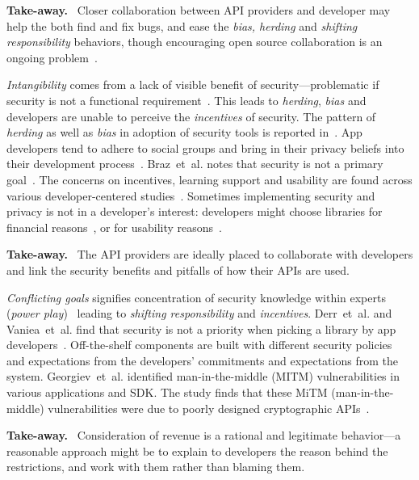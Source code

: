 \documentclass[conference]{IEEEtran}
\newenvironment{finding}{\begin{framed}\noindent\textbf{Take-away.}~}{\end{framed}}
\newcommand{\etal}[0]{et~al{.}}
\begin{document}
\begin{finding}
\noindent  
Closer collaboration between API providers and developer may help the both find and fix bugs, and ease the \emph{bias, herding} and \emph{shifting responsibility} behaviors, though encouraging open source collaboration is an ongoing problem~\cite{german2003gnome}.
\end{finding}

\emph{Intangibility} comes from a lack of visible benefit of security---problematic if security is not a functional requirement~\cite{acar2016}. This leads to \emph{herding}, \emph{bias} and developers are unable to perceive the \emph{incentives} of security. The pattern of \emph{herding} as well as \emph{bias} in adoption of security tools is reported in~\cite{witschey2015}. App developers tend to adhere to social groups and bring in their privacy beliefs into their development process~\cite{senarath2018,senarathundp2018}.  Braz~et~al{.} notes that security is not a primary goal~\cite{braz2021}. The concerns on incentives, learning support and usability are found across various developer-centered studies~\cite{tahaei2019,oliveira2014}. Sometimes implementing security and privacy is not in a developer's interest: developers might choose libraries for financial reasons~\cite{jain2014}, or for usability reasons~\cite{assal2018,thomas2018,hilton2017}. 
\begin{finding}
 \noindent  
The API providers are ideally placed to collaborate with developers and link the security benefits and pitfalls of how their APIs are used.
\end{finding}

\emph{Conflicting goals} signifies concentration of security knowledge within experts (\emph{power play})~\cite{weir2020,thomas2018,poller2017} leading to \emph{shifting responsibility} and \emph{incentives}. Derr~\etal{} and Vaniea~\etal{} find that security is not a priority when picking a library by app developers~\cite{erikacar2017,vaniea2016}. Off-the-shelf components are built with different security policies and expectations from the developers' commitments and expectations from the system. Georgiev~\etal{} identified man-in-the-middle (MITM) vulnerabilities in various applications and SDK. The study finds that these MiTM (man-in-the-middle) vulnerabilities were due to poorly designed cryptographic APIs~\cite{georgiev2012most}. 

\begin{finding}
\noindent  
Consideration of revenue is a rational and legitimate behavior---a reasonable approach might be to explain to developers the reason behind the restrictions, and work with them rather than blaming them. 
\end{finding}
\end{document}
